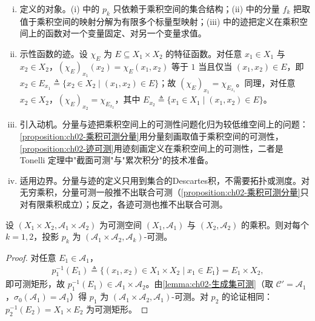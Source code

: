 \documentclass[../../main.tex]{subfiles}%
\begin{document}
\begin{remark}\label{remark:ch02-特征函数截面}
\label{remark:ch02-截口}
\begin{enumerate}[(i)]
\item 定义的对象。(i) 中的 $p_k$ 只依赖于乘积空间的集合结构；(ii) 中的分量 $f_k$ 把取值于乘积空间的映射分解为有限多个标量型映射；(iii) 中的迹把定义在乘积空间上的函数对一个变量固定、对另一个变量求值。
\item 示性函数的迹。设 $\chi_E$ 为 $E\subseteq X_1\times X_2$ 的特征函数。对任意 $x_1\in X_1$ 与 $x_2\in X_2$，$(\chi_E)_{x_1}(x_2)=\chi_E(x_1,x_2)$ 等于 $1$ 当且仅当 $(x_1,x_2)\in E$，即 $x_2\in E_{x_1}\triangleq\{x_2\in X_2\mid(x_1,x_2)\in E\}$；故 $(\chi_E)_{x_1}=\chi_{E_{x_1}}$。同理，对任意 $x_2\in X_2$，$(\chi_E)_{x_2}=\chi_{E_{x_2}}$，其中 $E_{x_2}\triangleq\{x_1\in X_1\mid(x_1,x_2)\in E\}$。
\item 引入动机。分量与迹把乘积空间上的可测性问题化归为较低维空间上的问题：\cref{proposition:ch02-乘积可测分量}用分量刻画取值于乘积空间的可测性，\cref{proposition:ch02-迹可测}用迹刻画定义在乘积空间上的可测性，二者是 Tonelli 定理中"截面可测"与"累次积分"的技术准备。
\item 适用边界。分量与迹的定义只用到集合的Descartes积，不需要拓扑或测度。对无穷乘积，分量可测一般推不出联合可测（\cref{proposition:ch02-乘积可测分量}只对有限乘积成立）；反之，各迹可测也推不出联合可测。
\end{enumerate}
\end{remark}

\begin{lemma}\label{lemma:ch02-投影可测}
设 $(X_1\times X_2,\mathscr A_1\times\mathscr A_2)$ 为可测空间 $(X_1,\mathscr A_1)$ 与 $(X_2,\mathscr A_2)$ 的乘积。则对每个 $k=1,2$，投影 $p_k$ 为 $(\mathscr A_1\times\mathscr A_2,\mathscr A_k)$-可测。
\end{lemma}

\begin{proof}
对任意 $E_1\in\mathscr A_1$，
\begin{align*}
p_1^{-1}(E_1)\triangleq \{(x_1,x_2)\in X_1\times X_2\mid x_1\in E_1\}=E_1\times X_2,
\end{align*}
即可测矩形，故 $p_1^{-1}(E_1)\in\mathscr A_1\times\mathscr A_2$。由\cref{lemma:ch02-生成集可测}（取 $\mathscr C'=\mathscr A_1$，$\sigma_0(\mathscr A_1)=\mathscr A_1$）得 $p_1$ 为 $(\mathscr A_1\times\mathscr A_2,\mathscr A_1)$-可测。对 $p_2$ 的论证相同：$p_2^{-1}(E_2)=X_1\times E_2$ 为可测矩形。
\end{proof}
\end{document}
